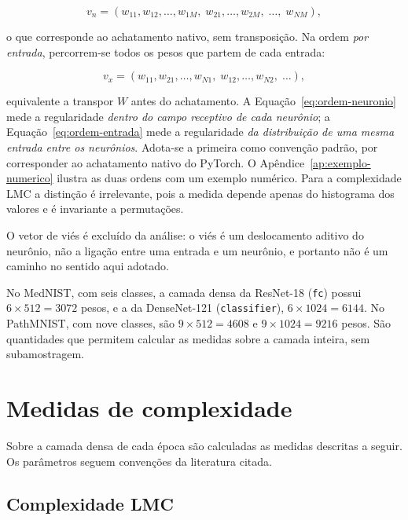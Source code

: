 \begin{equation}
    v_{n} = (w_{11}, w_{12}, \dots, w_{1M},\; w_{21}, \dots, w_{2M},\; \dots,\; w_{NM}),
    \label{eq:ordem-neuronio}
\end{equation}

\noindent
o que corresponde ao achatamento nativo, sem transposição. Na ordem
\emph{por entrada}, percorrem-se todos os pesos que partem de cada
entrada:

\begin{equation}
    v_{x} = (w_{11}, w_{21}, \dots, w_{N1},\; w_{12}, \dots, w_{N2},\; \dots),
    \label{eq:ordem-entrada}
\end{equation}

\noindent
equivalente a transpor $W$ antes do achatamento. A
Equação~\ref{eq:ordem-neuronio} mede a regularidade \emph{dentro do campo
receptivo de cada neurônio}; a Equação~\ref{eq:ordem-entrada} mede a
regularidade \emph{da distribuição de uma mesma entrada entre os
neurônios}. Adota-se a primeira como convenção padrão, por corresponder ao
achatamento nativo do PyTorch. O Apêndice~\ref{ap:exemplo-numerico} ilustra as duas ordens
com um exemplo numérico. Para a complexidade LMC a distinção é
irrelevante, pois a medida depende apenas do histograma dos valores e é
invariante a permutações.

O vetor de viés é excluído da análise: o viés é um deslocamento aditivo
do neurônio, não a ligação entre uma entrada e um neurônio, e portanto
não é um caminho no sentido aqui adotado.

No MedNIST, com seis classes, a camada densa da ResNet-18 (\texttt{fc})
possui $6 \times 512 = \num{3072}$ pesos, e a da DenseNet-121
(\texttt{classifier}), $6 \times \num{1024} = \num{6144}$. No PathMNIST, com
nove classes, são $9 \times 512 = \num{4608}$ e $9 \times \num{1024} =
\num{9216}$ pesos. São quantidades que permitem calcular as medidas
sobre a camada inteira, sem subamostragem.

\section{Medidas de complexidade}
\label{sec:medidas}

Sobre a camada densa de cada época são calculadas as medidas descritas a
seguir. Os parâmetros seguem convenções da literatura citada.

\subsection{Complexidade LMC}
\label{sec:medidas-lmc}

